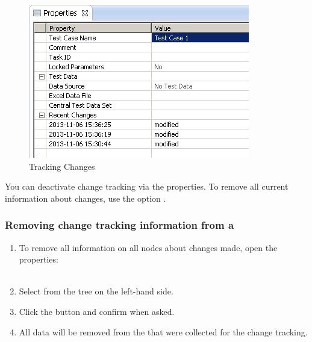 \begin{figure}[h]
\begin{center}
\includegraphics{Tasks/Projects/PS/ChangeTrackingPropView}
\caption{Tracking Changes}
\label{TasksTrackChangesPropView}
\end{center}
\end{figure}

You can deactivate change tracking via the \gdproject{} properties. To remove all current information about changes, use the  option .

\subsubsection{Removing change tracking information from a \gdproject}
\label{TasksRemoveChangeTracking}
\begin{enumerate}
\item To remove all information on all nodes about changes made, open the \gdproject{} properties:\\
\\
\item Select  from the tree on the left-hand side.
\item Click the button  and confirm when asked. 
\item All data will be removed from the \gdproject{} that were collected for the change tracking. 
\end{enumerate}
